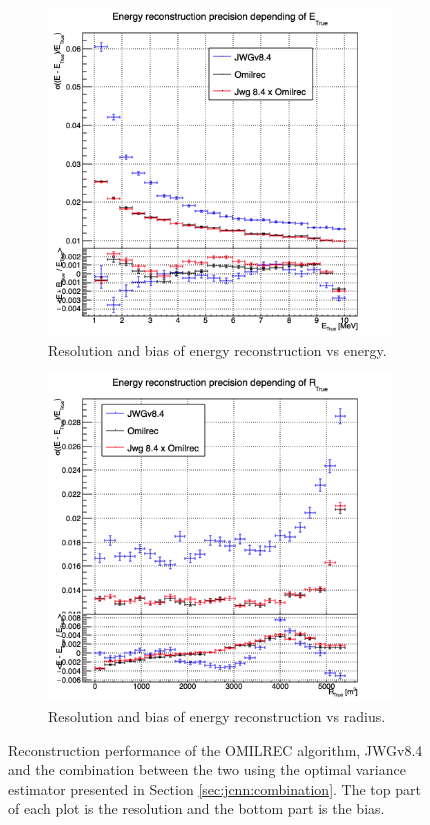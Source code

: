 \documentclass[../main.tex]{subfiles}
\begin{document}
\begin{figure}[ht]
  \centering
  \begin{subfigure}[t]{0.48\linewidth}
    \centering
    \includegraphics[width=\linewidth]{images/jgnn/MSBvTE.png}
    \caption{Resolution and bias of energy reconstruction vs energy.}
    \label{fig:jgnn:MESBvETC}
  \end{subfigure}
  \begin{subfigure}[t]{0.48\linewidth}
    \centering
    \includegraphics[width=\linewidth]{images/jgnn/MESBvRT.png}
    \caption{Resolution and bias of energy reconstruction vs radius.}
    \label{fig:jgnn:MESBvRTC}
  \end{subfigure}
  \caption{Reconstruction performance of the OMILREC algorithm, JWGv8.4 and the combination between the two using the optimal variance estimator presented in Section \ref{sec:jcnn:combination}. The top part of each plot is the resolution and the bottom part is the bias.}
  \label{fig:jgnn:results_1}
\end{figure}
\end{document}
